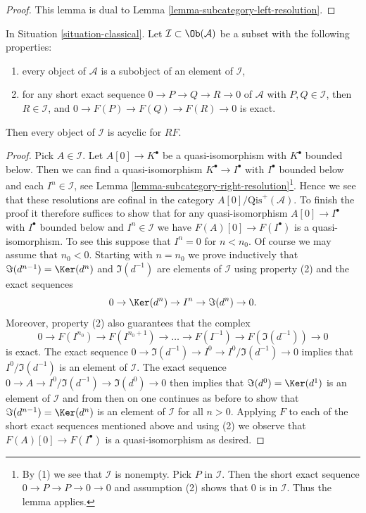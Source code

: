 \begin{proof}
This lemma is dual to Lemma \ref{lemma-subcategory-left-resolution}.
\end{proof}

\begin{lemma}
\label{lemma-subcategory-right-acyclics}
In
Situation \ref{situation-classical}.
Let $\mathcal{I} \subset \Ob(\mathcal{A})$ be a subset with the
following properties:
\begin{enumerate}
\item every object of $\mathcal{A}$ is a subobject of an element of
$\mathcal{I}$,
\item for any short exact sequence $0 \to P \to Q \to R \to 0$ of
$\mathcal{A}$ with $P, Q \in \mathcal{I}$, then $R \in \mathcal{I}$,
and $0 \to F(P) \to F(Q) \to F(R) \to 0$ is exact.
\end{enumerate}
Then every object of $\mathcal{I}$ is acyclic for $RF$.
\end{lemma}

\begin{proof}
Pick $A \in \mathcal{I}$. Let $A[0] \to K^\bullet$
be a quasi-isomorphism with $K^\bullet$
bounded below. Then we can find a quasi-isomorphism
$K^\bullet \to I^\bullet$ with $I^\bullet$ bounded below and
each $I^n \in \mathcal{I}$, see
Lemma \ref{lemma-subcategory-right-resolution}\footnote{By (1)
we see that $\mathcal{I}$ is nonempty. Pick $P$ in $\mathcal{I}$.
Then the short exact sequence $0 \to P \to P \to 0 \to 0$ and assumption (2)
shows that $0$ is in $\mathcal{I}$. Thus the lemma applies.}.
Hence we see that these resolutions are cofinal in the category
$A[0]/\text{Qis}^{+}(\mathcal{A})$. To finish the proof it therefore
suffices to show that for any quasi-isomorphism
$A[0] \to I^\bullet$ with $I^\bullet$ bounded below and $I^n \in \mathcal{I}$
we have $F(A)[0] \to F(I^\bullet)$ is a quasi-isomorphism.
To see this suppose that $I^n = 0$ for $n < n_0$. Of course we may assume
that $n_0 < 0$. Starting with $n = n_0$ we prove inductively that
$\Im(d^{n - 1}) = \Ker(d^n)$ and $\Im(d^{-1})$
are elements of $\mathcal{I}$ using property (2) and the exact sequences
$$
0 \to \Ker(d^n) \to I^n \to \Im(d^n) \to 0.
$$
Moreover, property (2) also guarantees that the complex
$$
0 \to F(I^{n_0}) \to F(I^{n_0 + 1}) \to \ldots \to F(I^{-1}) \to
F(\Im(d^{-1})) \to 0
$$
is exact. The exact sequence
$0 \to \Im(d^{-1}) \to I^0 \to I^0/\Im(d^{-1}) \to 0$
implies that $I^0/\Im(d^{-1})$ is an element of $\mathcal{I}$.
The exact sequence $0 \to A \to I^0/\Im(d^{-1}) \to \Im(d^0) \to 0$
then implies that $\Im(d^0) = \Ker(d^1)$ is an element of
$\mathcal{I}$ and from then on one continues as before to show that
$\Im(d^{n - 1}) = \Ker(d^n)$ is an element of $\mathcal{I}$
for all $n > 0$. Applying $F$ to each of the short exact sequences
mentioned above and using (2) we observe that $F(A)[0] \to F(I^\bullet)$
is a quasi-isomorphism as desired.
\end{proof}

